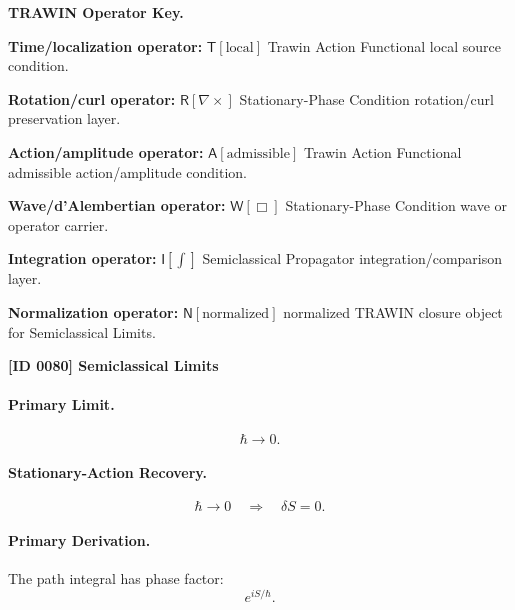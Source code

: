 \par\vspace{0.45\baselineskip}
\noindent\begin{minipage}[t]{\linewidth}
\begingroup
\small
\raggedright
\textbf{TRAWIN Operator Key.}\par
\noindent\textbf{Time/localization operator:} $\mathsf{T}\!\left[\mathrm{local}\right]$ Trawin Action Functional local source condition.\par
\noindent\textbf{Rotation/curl operator:} $\mathsf{R}\!\left[\nabla\times\right]$ Stationary-Phase Condition rotation/curl preservation layer.\par
\noindent\textbf{Action/amplitude operator:} $\mathsf{A}\!\left[\mathrm{admissible}\right]$ Trawin Action Functional admissible action/amplitude condition.\par
\noindent\textbf{Wave/d'Alembertian operator:} $\mathsf{W}\!\left[\Box\right]$ Stationary-Phase Condition wave or operator carrier.\par
\noindent\textbf{Integration operator:} $\mathsf{I}\!\left[\int\right]$ Semiclassical Propagator integration/comparison layer.\par
\noindent\textbf{Normalization operator:} $\mathsf{N}\!\left[\mathrm{normalized}\right]$ normalized TRAWIN closure object for Semiclassical Limits.\par
\endgroup
\end{minipage}

\clearpage
\noindent\textbf{[ID 0080] Semiclassical Limits}\par
\vspace{0.35em}
\paragraph{Primary Limit.}
\begin{equation}
\hbar\rightarrow 0 .
\end{equation}

\paragraph{Stationary-Action Recovery.}
\begin{equation}
\hbar\rightarrow 0
\quad\Longrightarrow\quad
\delta S=0 .
\end{equation}

\paragraph{Primary Derivation.}
The path integral has phase factor:
\begin{equation}
e^{iS/\hbar}.
\end{equation}

